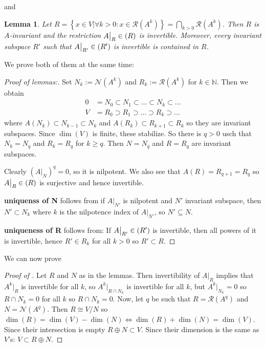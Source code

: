\documentclass[10pt,twoside,openany,final]{memoir}
\theoremstyle{break}
\newtheorem{lemma}[section]{Lemma}
\theoremstyle{Break}
\let\End\relax
\DeclareMathOperator{\End}{End}
\newcommand{\N}{\mathbb{N}}
\newcommand{\Rg}{\mathcal{R}}
\newcommand{\Nl}{\mathcal{N}}
\begin{document}
and
\begin{lemma}
	Let $R=\left\{ x \in V \big| \forall k > 0 : x \in \Rg(A^k) \right\}=\bigcap_{k > 0 } \Rg(A^k)$. Then $R$ is $A$-invariant and the restriction $A\big|_{R}\in \End(R)$ is invertible. Moreover, every invariant subspace $R'$ such that $A\big|_{R'}\in \End(R')$ is invertible is contained in $R$.	
\end{lemma}
We prove both of them at the same time:
\begin{proof}[Proof of lemmas:]
	Set $N_k:=\Nl(A^k)$ and $R_k:=\Rg(A^k)$ for $k \in \N$. Then we obtain
	\begin{align*}
		0 &= N_0 \subset N_1 \subset \dots \subset N_k \subset \dots\\
		V &= R_0 \supset R_1 \supset \dots \supset R_k \supset \dots
	\end{align*}
	where $A(N_k) \subset N_{k-1}\subset N_k$ and $A(R_k) \subset R_{k+1} \subset R_k$ so they are invariant subspaces. Since $\dim(V)$ is finite, these stabilize. So there is $q>0$ usch that $N_k=N_q$ and $R_k=R_q$ for $k \geq q$. Then $N=N_q$ and $R=R_q$ are invariant subspaces.

	Clearly $(A\big|_{N})^q=0$, so it is nilpotent. We also see that $A(R)=R_{q+1}=R_q$ so $A\big|_{R} \in \End(R)$ is surjective and hence invertible. 

	\textbf{uniquenss of N} follows from if $A\big|_{N'}$ is nilpotent and $N'$ invariant subspace, then $N' \subset N_k$ where $k$ is the nilpotence index of $A\big|_{N'}$, so $N' \subseteq N$.

	\textbf{uniqueness of R} follows from: If $A\big|_{R'} \in \End(R')$ is invertible, then all powers of it is invertible, hence $R' \in R_k$ for all $k >0$ so $R' \subset R$.
\end{proof}
We can now prove 
\begin{proof}[Proof of ]
	Let $R$ and $N$ as in the lemmas. Then invertibility of $A\big|_{R}$ implies that $A^k\big|_R$ is invertible for all $k$, so $A^k\big|_{R \cap N_k}$ is invertible for all $k$, but $A^k\big|_{N_k}=0$ so $R\cap N_k=0$ for all $k$ so $R \cap N_k=0$. Now, let $q$ be such that $R=\Rg(A^q)$ and $N=\Nl(A^q)$. Then $R\cong V/N$ so $\dim(R)=\dim(V)-\dim(N)\iff \dim(R)+\dim(N)=\dim(V)$. Since their intersection is empty $R \oplus N \subset V$. Since their dimension is the same as $V$'s: $V \subset  R \oplus N$.
\end{proof}
\end{document}
